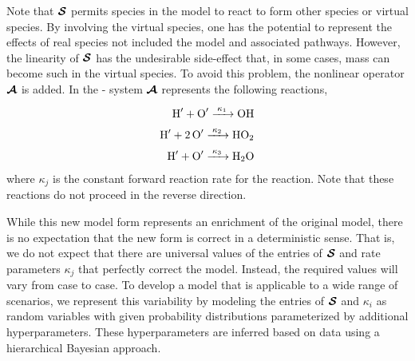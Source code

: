 \documentclass[fontsize=12pt, %
               paper=a4, %
               hyperref]{report}
\begin{document}
  Note that $\boldsymbol{\mathcal{S}}$ permits species in the model to react to form other
  species or virtual species.  By involving the virtual species, one has
  the potential to represent the effects of real species not included the
  model and associated pathways.  However, the linearity of $\boldsymbol{\mathcal{S}}$ has
  the undesirable side-effect that, in some cases, mass can become such
  in the virtual species.  To avoid this problem, the nonlinear operator
  $\boldsymbol{\mathcal{A}}$ is added.  In the - system $\boldsymbol{\mathcal{A}}$
  represents the following reactions,
  \begin{align}
    \ce{H^{\prime} + O^{\prime}  ->[\kappa_{1}] OH} \\
    \ce{H^{\prime} + 2O^{\prime} ->[\kappa_{2}] HO2} \\
    \ce{H^{\prime} + O^{\prime}  ->[\kappa_{3}] H2O}
  \end{align} 
  where $\kappa_{j}$ is the constant forward reaction rate for the reaction.  Note that 
  these reactions do not proceed in the reverse direction.
  
  While this new model form represents an enrichment of the original
  model, there is no expectation that the new form is correct in a
  deterministic sense.  That is, we do not expect that there are
  universal values of the entries of $\boldsymbol{\mathcal{S}}$ and rate parameters
  $\kappa_j$ that perfectly correct the model.  Instead, the required
  values will vary from case to case.  To develop a model that is
  applicable to a wide range of scenarios, we represent this variability
  by modeling the entries of $\boldsymbol{\mathcal{S}}$ and $\kappa_i$ as random variables
  with given probability distributions parameterized by additional
  hyperparameters.  These hyperparameters are inferred based on data
  using a hierarchical Bayesian approach.
  
\end{document}
